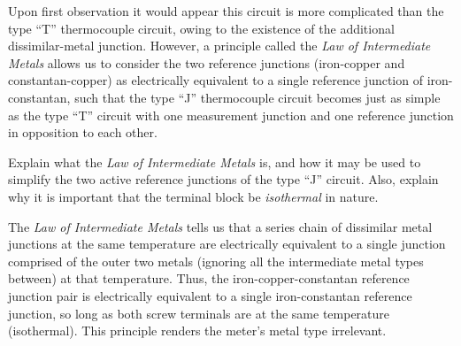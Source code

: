Upon first observation it would appear this circuit is more complicated than the type ``T'' thermocouple circuit, owing to the existence of the additional dissimilar-metal junction.  However, a principle called the {\it Law of Intermediate Metals} allows us to consider the two reference junctions (iron-copper and constantan-copper) as electrically equivalent to a single reference junction of iron-constantan, such that the type ``J'' thermocouple circuit becomes just as simple as the type ``T'' circuit with one measurement junction and one reference junction in opposition to each other.

Explain what the {\it Law of Intermediate Metals} is, and how it may be used to simplify the two active reference junctions of the type ``J'' circuit.  Also, explain why it is important that the terminal block be {\it isothermal} in nature.







The {\it Law of Intermediate Metals} tells us that a series chain of dissimilar metal junctions at the same temperature are electrically equivalent to a single junction comprised of the outer two metals (ignoring all the intermediate metal types between) at that temperature.  Thus, the iron-copper-constantan reference junction pair is electrically equivalent to a single iron-constantan reference junction, so long as both screw terminals are at the same temperature (isothermal).  This principle renders the meter's metal type irrelevant.
 










